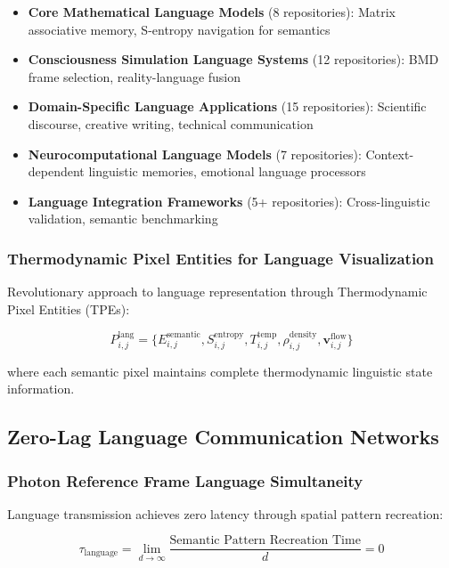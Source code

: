 \documentclass[12pt,a4paper]{article}
\begin{document}
\begin{itemize}
\item \textbf{Core Mathematical Language Models} (8 repositories): Matrix associative memory, S-entropy navigation for semantics
\item \textbf{Consciousness Simulation Language Systems} (12 repositories): BMD frame selection, reality-language fusion
\item \textbf{Domain-Specific Language Applications} (15 repositories): Scientific discourse, creative writing, technical communication
\item \textbf{Neurocomputational Language Models} (7 repositories): Context-dependent linguistic memories, emotional language processors
\item \textbf{Language Integration Frameworks} (5+ repositories): Cross-linguistic validation, semantic benchmarking
\end{itemize}

\subsubsection{Thermodynamic Pixel Entities for Language Visualization}

Revolutionary approach to language representation through Thermodynamic Pixel Entities (TPEs):

\begin{equation}
P_{i,j}^{\text{lang}} = \{E_{i,j}^{\text{semantic}}, S_{i,j}^{\text{entropy}}, T_{i,j}^{\text{temp}}, \rho_{i,j}^{\text{density}}, \mathbf{v}_{i,j}^{\text{flow}}\}
\end{equation}

where each semantic pixel maintains complete thermodynamic linguistic state information.

\subsection{Zero-Lag Language Communication Networks}

\subsubsection{Photon Reference Frame Language Simultaneity}

Language transmission achieves zero latency through spatial pattern recreation:

\begin{equation}
\tau_{\text{language}} = \lim_{d \rightarrow \infty} \frac{\text{Semantic Pattern Recreation Time}}{d} = 0
\end{equation}
\end{document}
